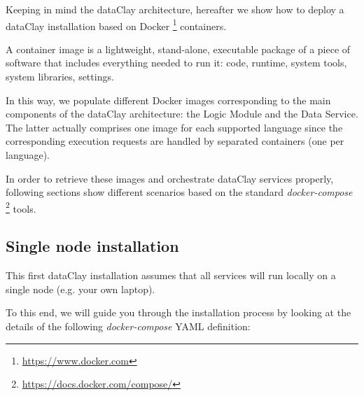 Keeping in mind the dataClay architecture, hereafter we show how to deploy a dataClay installation based on Docker \footnote{\url{https://www.docker.com}} containers.

A container image is a lightweight, stand-alone, executable package of a piece of software that includes everything needed to run it: code, runtime, system tools, system libraries, settings. 

In this way, we populate different Docker images corresponding to the main components of the dataClay architecture: the Logic Module and the Data Service. The latter actually comprises one image for each supported language since the corresponding execution requests are handled by separated containers (one per language). 

In order to retrieve these images and orchestrate dataClay services properly, following sections show different scenarios based on the standard \textit{docker-compose} \footnote{\url{https://docs.docker.com/compose/}} tools.

\subsection{Single node installation}
\label{sec:SingleNodeInstall}
This first dataClay installation assumes that all services will run locally on a single node (e.g. your own laptop).

To this end, we will guide you through the installation process by looking at the details of the following \textit{docker-compose} YAML definition:

